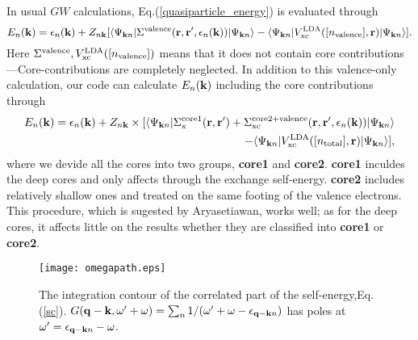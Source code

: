 \documentclass[a4paper,10pt,epsf,fleqn]{article}
\begin{document}
In usual $GW$ calculations, 
Eq.(\ref{quasiparticle_energy}) is evaluated through
\begin{equation}\label{qpgwnc}
E_n({\bf k})=\epsilon_n({\bf k})+Z_{n{\bf k}}[\langle\Psi_{{\bf k}n}|
\Sigma^{\rm valence}({\bf r},{\bf r}^{\prime},\epsilon_n({\bf k}))|\Psi_{{\bf k}n}\rangle
- \langle\Psi_{{\bf k}n}|V_{\rm xc}^{\rm LDA}([n_{\rm valence}],{\bf r})|\Psi_{{\bf k}n}\rangle].
\end{equation}
Here $\Sigma^{\rm valence},V_{\rm xc}^{\rm LDA}([n_{\rm valence}])$ means that it does not contain
core contributions---Core-contributions are completely neglected.
In addition to this valence-only calculation, our code can
calculate $E_n({\bf k})$ including the core contributions through
\begin{eqnarray}
E_n({\bf k})=\epsilon_n({\bf k})+
Z_{n{\bf k}}\times [\langle\Psi_{{\bf k}n}|
\Sigma_{\rm x}^{\rm core1}({\bf r},{\bf r}^{\prime})+
\Sigma_{\rm xc}^{\rm core2+valence}({\bf r},{\bf r}^{\prime},\epsilon_n({\bf k}))|\Psi_{{\bf k}n}\rangle \nonumber \\
- \langle\Psi_{{\bf k}n}|V_{\rm xc}^{\rm LDA}([n_{\rm total}],{\bf r})|\Psi_{{\bf k}n}\rangle],
\label{qpgw}
\end{eqnarray}
where we devide all the cores into two groups, {\bf core1} and {\bf core2}.
{\bf core1} inculdes the deep cores and only affects
through the exchange self-energy. {\bf core2} includes relatively shallow
ones and treated on the same footing of the valence electrons.
This procedure, which is sugested by Aryasetiawan, works well; as for the deep cores,
it affects little on the results whether they are classified into {\bf core1} or {\bf core2}.
\begin{figure}
\texttt{[image: omegapath.eps]} \label{omegapath}
\caption[]{The integration contour of the correlated part of the self-energy,Eq.(\ref{sc}).
$G({\bf q-k},\omega'+\omega)= \sum_{n} {1}/{(\omega'+ \omega- \epsilon_{{\bf q-k}n})}$ 
has poles at $\omega'=\epsilon_{{\bf q-k}n}-\omega$. }
\label{omegapath}
\end{figure}



\newpage
\end{document}
